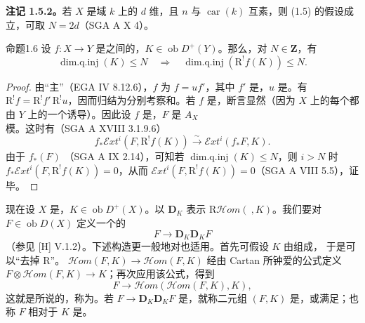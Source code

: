 \textbf{注记 1.5.2。}若 $X$ 是域 $k$ 上的 $d$ 维，且 $n$ 与 $\operatorname{car}(k)$ 互素，则 (1.5) 的假设成立，可取 $N=2d$（SGA A X 4）。

\begin{SGAresult}{命题}{1.6}
设 $f:X\longrightarrow Y$ 是之间的，$K\in\operatorname{ob}D^+(Y)$。那么，对 $N\in\mathbf Z$，有
\[
 \operatorname{dim.q.inj}(K)\le N\quad\Longrightarrow\quad
 \operatorname{dim.q.inj}(\mathrm R^!f(K))\le N.
\]
\end{SGAresult}
\begin{proof}
由“主”（EGA IV 8.12.6），$f$ 为 $f=uf'$，其中 $f'$ 是，$u$ 是。有 $\mathrm R^!f=\mathrm R^!f'\,\mathrm R^!u$，因而归结为分别考察和。若 $f$ 是，断言显然（因为 $X$ 上的每个都由 $Y$ 上的一个诱导）。因此设 $f$ 是，$F$ 是 $A_X$ 模。这时有（SGA A XVIII 3.1.9.6）
\[
 f_*\mathcal Ext^i(F,\mathrm R^!f(K))\xrightarrow{\sim}\mathcal Ext^i(f_*F,K).
\]
由于 $f_*(F)$ （SGA A IX 2.14），可知若 $\operatorname{dim.q.inj}(K)\le N$，则 $i>N$ 时 $f_*\mathcal Ext^i(F,\mathrm R^!f(K))=0$，从而 $\mathcal Ext^i(F,\mathrm R^!f(K))=0$（SGA A VIII 5.5），证毕。
\end{proof}
现在设 $X$ 是，$K\in\operatorname{ob}D^+(X)$。以 $\mathbf D_K$ 表示 $\mathrm R\mathcal Hom(\ ,K)$。我们要对 $F\in\operatorname{ob}D(X)$ 定义一个的
\[
 F\longrightarrow\mathbf D_K\mathbf D_KF
\]
（参见 [H] V.1.2）。下述构造更一般地对也适用。首先可假设 $K$ 由组成，
于是可以“去掉 $\mathrm R$”。 $\mathcal Hom(F,K)\longrightarrow\mathcal Hom(F,K)$ 经由 Cartan 所钟爱的公式定义 $F\otimes\mathcal Hom(F,K)\longrightarrow K$；再次应用该公式，得到
\[
 F\longrightarrow\mathcal Hom(\mathcal Hom(F,K),K),
\]
这就是所说的，称为。若 $F\longrightarrow\mathbf D_K\mathbf D_KF$ 是，就称二元组 $(F,K)$ 是，或满足；也称 $F$ 相对于 $K$ 是。


